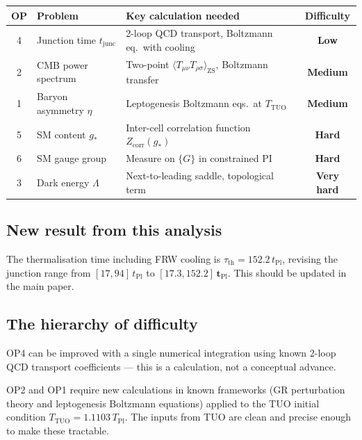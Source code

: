 \documentclass[12pt,a4paper]{article}
\theoremstyle{remark}
\newcommand{\tPl}{t_{\mathrm{Pl}}}
\newcommand{\TPl}{T_{\mathrm{Pl}}}
\newcommand{\gstar}{g_{*}}
\newcommand{\TTUO}{T_{\mathrm{TUO}}}
\newcommand{\junc}{t_{\mathrm{junc}}}
\begin{document}
\begin{center}
\begin{tabular}{clp{5cm}c}
\toprule
OP & Problem & Key calculation needed & Difficulty \\
\midrule
4 & Junction time $\junc$ &
  2-loop QCD transport, Boltzmann eq.\ with cooling &
  {\color{green!60!black}\textbf{Low}} \\
2 & CMB power spectrum &
  Two-point $\langle T_{\mu\nu}T_{\rho\sigma}\rangle_\mathrm{ZS}$,
  Boltzmann transfer &
  {\color{orange}\textbf{Medium}} \\
1 & Baryon asymmetry $\eta$ &
  Leptogenesis Boltzmann eqs.\ at $T_\mathrm{TUO}$ &
  {\color{orange}\textbf{Medium}} \\
5 & SM content $\gstar$ &
  Inter-cell correlation function $Z_\mathrm{corr}(\gstar)$ &
  {\color{red}\textbf{Hard}} \\
6 & SM gauge group &
  Measure on $\{G\}$ in constrained PI &
  {\color{red}\textbf{Hard}} \\
3 & Dark energy $\Lambda$ &
  Next-to-leading saddle, topological term &
  {\color{red}\textbf{Very hard}} \\
\bottomrule
\end{tabular}
\end{center}

\subsection{New result from this analysis}

\begin{tcolorbox}[findingbox,title={OP4 Correction}]
The thermalisation time including FRW cooling is $\tau_\mathrm{th} = 152.2\,\tPl$,
revising the junction range from $[17, 94]\,\tPl$ to $\mathbf{[17.3, 152.2]\,\tPl}$.
This should be updated in the main paper.
\end{tcolorbox}

\subsection{The hierarchy of difficulty}

OP4 can be improved with a single numerical integration using
known 2-loop QCD transport coefficients --- this is a calculation,
not a conceptual advance.

OP2 and OP1 require new calculations in known frameworks
(GR perturbation theory and leptogenesis Boltzmann equations) applied
to the TUO initial condition $\TTUO = 1.1103\,\TPl$.
The inputs from TUO are clean and precise enough to make these tractable.
\end{document}
